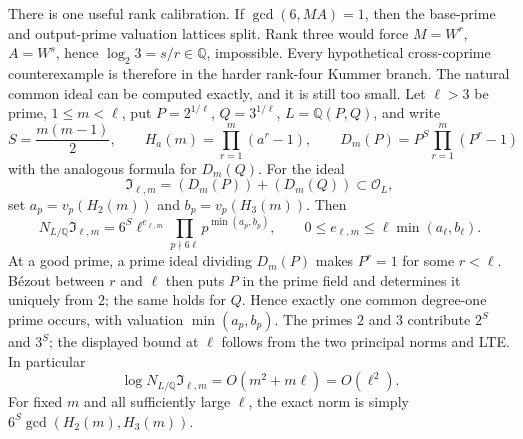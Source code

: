 \documentclass[11pt,oneside]{article}
\theoremstyle{definition}
\theoremstyle{remark}
\newcommand{\Q}{\mathbb Q}
\begin{document}
There is one useful rank calibration.  If $\gcd(6,MA)=1$, then the base-prime and output-prime
valuation lattices split.  Rank three would force $M=W^r$, $A=W^s$, hence
$\log_2 3=s/r\in\Q$, impossible.  Every hypothetical cross-coprime counterexample is
therefore in the harder rank-four Kummer branch.  The natural common ideal can be computed
exactly, and it is still too small.  Let $\ell>3$ be prime, $1\le m<\ell$, put
$P=2^{1/\ell}$, $Q=3^{1/\ell}$, $L=\Q(P,Q)$, and write
\[
 S=\frac{m(m-1)}2,\qquad
 H_a(m)=\prod_{r=1}^m(a^r-1),\qquad
 D_m(P)=P^S\prod_{r=1}^m(P^r-1)
\]
with the analogous formula for $D_m(Q)$.  For the ideal
\begin{equation}
 \mathfrak I_{\ell,m}=(D_m(P))+(D_m(Q))\subset\mathcal O_L,
 \label{crit:eq-newton-kummer-ideal}
\end{equation}
set $a_p=v_p(H_2(m))$ and $b_p=v_p(H_3(m))$.  Then
\begin{equation}
 \boxed{
 N_{L/\Q}\mathfrak I_{\ell,m}
 =6^S\ell^{e_{\ell,m}}
   \prod_{p\nmid6\ell}p^{\min(a_p,b_p)},
 \qquad
 0\le e_{\ell,m}\le\ell\min(a_\ell,b_\ell).}
 \label{crit:eq-newton-kummer-ideal-norm}
\end{equation}
At a good prime, a prime ideal dividing $D_m(P)$ makes $P^r=1$ for some $r<\ell$.
B\'ezout between $r$ and $\ell$ then puts $P$ in the prime field and determines it uniquely
from $2$; the same holds for $Q$.  Hence exactly one common degree-one prime occurs, with
valuation $\min(a_p,b_p)$.  The primes $2$ and $3$ contribute $2^S$ and $3^S$; the displayed
bound at $\ell$ follows from the two principal norms and LTE.  In particular
\begin{equation}
 \log N_{L/\Q}\mathfrak I_{\ell,m}=O(m^2+m\ell)=O(\ell^2).
 \label{crit:eq-newton-kummer-ideal-size}
\end{equation}
For fixed $m$ and all sufficiently large $\ell$, the exact norm is simply
$6^S\gcd(H_2(m),H_3(m))$.
\end{document}
